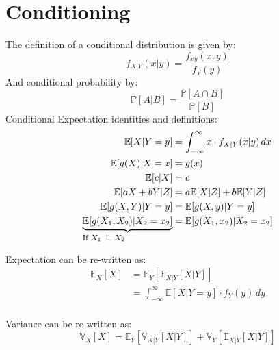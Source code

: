 \section{Conditioning}
The definition of a conditional distribution is given by:
\begin{equation*}
    f_{X|Y}(x|y) = \frac{f_{xy}(x, y)}{f_Y(y)}
\end{equation*}
And conditional probability by:
\begin{equation*}
    \mathbb{P}[A|B] = \frac{ \mathbb{P}[A \cap B]}{ \mathbb{P}[B] }
\end{equation*}
Conditional Expectation identities and definitions:
\begin{equation*}
    \begin{aligned}
        \mathbb{E}[X|Y=y] &= \int_{-\infty}^{\infty} x \cdot f_{X|Y}(x|y) \,dx \\
        \mathbb{E}[g(X)|X=x] &= g(x) \\
        \mathbb{E}[c | X] &= c \\
        \mathbb{E}[aX + bY | Z] &= a \mathbb{E}[X|Z] + b \mathbb{E}[Y|Z] \\
        \mathbb{E}[g(X, Y) | Y=y] &= \mathbb{E}[g(X, y) | Y=y] \\
        \explain{\mathbb{E}[g(X_1, X_2) | X_2=x_2]}{If $X_1 \indep X_2$} &= \mathbb{E}[g(X_1, x_2) | X_2=x_2] \\
    \end{aligned}
\end{equation*}

Expectation can be re-written as:
\begin{equation*}
    \begin{aligned}
        \mathbb{E}_X[X] &= \mathbb{E}_Y[ \mathbb{E}_{X|Y}[X|Y] ] \\
            &= \int_{-\infty}^{\infty} \mathbb{E}[X|Y=y] \cdot f_Y(y) \,dy \\
    \end{aligned}
\end{equation*}

Variance can be re-written as:
\begin{equation*}
    \mathbb{V}_X[X] = \mathbb{E}_Y[ \mathbb{V}_{X|Y}[X|Y] ] + \mathbb{V}_Y[
    \mathbb{E}_{X|Y}[X|Y] ] 
\end{equation*}


